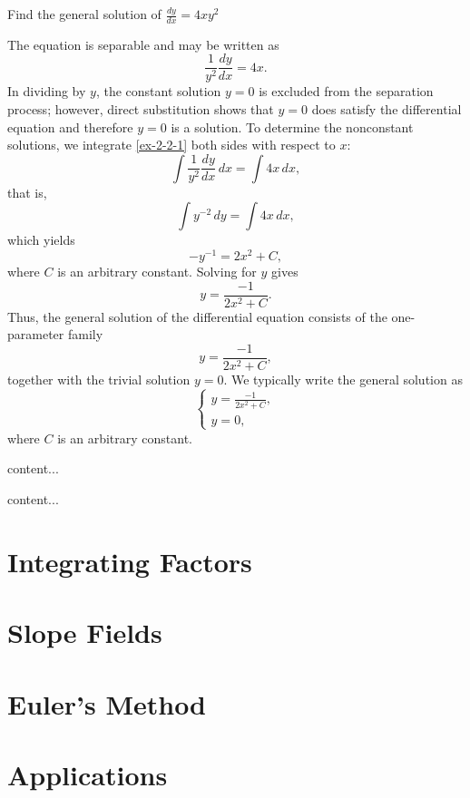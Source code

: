 \begin{example}
	Find the general solution of \(\frac{dy}{dx} = 4xy^2\)
\end{example}
\begin{solution}
	
	The equation is separable and may be written as
	\begin{equation}\label{ex-2-2-1}
	\frac{1}{y^2}\frac{dy}{dx} = 4x.
	\end{equation}
	In dividing by \(y\), the constant solution \(y=0\) is excluded from the separation process; however, direct substitution shows that \(y=0\) does satisfy the differential equation and therefore $y =0$ is a solution. To determine the nonconstant solutions, we integrate \eqref{ex-2-2-1} both sides with respect to $x$:
	\[
	\int \frac{1}{y^2}\frac{dy}{dx}\, dx = \int 4x\, dx,
	\]
	that is,
	\[
	\int y^{-2}\, dy =  \int 4x\, dx,
	\]
	which yields
		\[
	 -y^{-1}=  2x^2+C,
	\]
	where $C$ is an arbitrary constant. Solving for $y$ gives
	\[y =  \frac{-1}{2x^2 +C}.\]
	Thus, the general solution of the differential equation consists of the one-parameter family
	\[
	y = \frac{-1}{2x^2 + C},
	\]
	together with the trivial solution \(y = 0\). We typically write the general solution   as
	\[
	\begin{cases}
		y = \displaystyle\frac{-1}{2x^2 + C},\\
		y = 0,
	\end{cases}
	\]
	where \(C\) is an arbitrary constant.
	
	
\end{solution}

 
\begin{example}
	content...
\end{example}

\begin{example}
	content...
\end{example}



\section{Integrating Factors}

\section{Slope Fields}

\section{Euler’s Method}

\section{Applications}